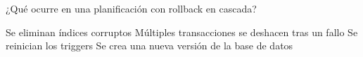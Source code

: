 \question[1] ¿Qué ocurre en una planificación con rollback en cascada?
\begin{choices}
\choice Se eliminan índices corruptos
\CorrectChoice Múltiples transacciones se deshacen tras un fallo
\choice Se reinician los triggers
\choice Se crea una nueva versión de la base de datos
\end{choices}